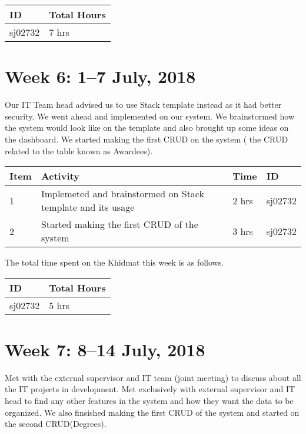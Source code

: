 \documentclass{article}
\begin{document}
\begin{tabular}{|l|l|}
  \hline
  ID & Total Hours\\\hline\hline
  sj02732 & 7 hrs\\\hline
\end{tabular}

\newpage %
\section*{Week 6: 1--7 July, 2018}

Our IT Team head advised us to use Stack template instead as it had better security. We went ahead and implemented on our system. We brainstormed how the system would look like on the template and also brought up some ideas on the dashboard. We started making the first CRUD on the system ( the CRUD related to the table known as Awardees). \newline

\begin{tabular}{|l|l|l|l|}
  \hline
  Item 	& Activity & Time & ID \\\hline\hline
  1	& Implemeted and brainstormed on Stack template and its usage & 2 hrs & sj02732 \\\hline
  2	& Started making the first CRUD of the system & 3 hrs & sj02732 \\\hline
\end{tabular}
\newline
The total time spent on the Khidmat this week is as follows.

\begin{tabular}{|l|l|}
  \hline
  ID & Total Hours\\\hline\hline
  sj02732 & 5 hrs\\\hline
\end{tabular}

\newpage %
\section*{Week 7: 8--14 July, 2018}

Met with the external supervisor and IT team (joint meeting) to discuss about all the IT projects in development. Met exclusively with external supervisor and IT head to find any other features in the system and how they want the data to be organized. We also finsished making the first CRUD of the system and started on the second CRUD(Degrees). \newline
\end{document}
